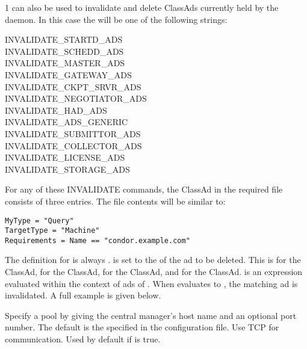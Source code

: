 \begin{ManPage}{\label{man-condor-advertise}}{1}
 can also be used to invalidate and delete
ClassAds currently held by the  daemon.  In this case
the  will be one of the following strings:
\begin{description}
\item[INVALIDATE\_STARTD\_ADS]
\item[INVALIDATE\_SCHEDD\_ADS]
\item[INVALIDATE\_MASTER\_ADS]
\item[INVALIDATE\_GATEWAY\_ADS]
\item[INVALIDATE\_CKPT\_SRVR\_ADS]
\item[INVALIDATE\_NEGOTIATOR\_ADS]
\item[INVALIDATE\_HAD\_ADS]
\item[INVALIDATE\_ADS\_GENERIC]
\item[INVALIDATE\_SUBMITTOR\_ADS]
\item[INVALIDATE\_COLLECTOR\_ADS]
\item[INVALIDATE\_LICENSE\_ADS]
\item[INVALIDATE\_STORAGE\_ADS]
\end{description}

For any of these INVALIDATE commands, the ClassAd in the required file
consists of three entries.
The file contents will be similar to:
\begin{verbatim}
MyType = "Query"
TargetType = "Machine"
Requirements = Name == "condor.example.com"
\end{verbatim}
The definition for  is always .
 is set to the  of the ad to be deleted.
This  is
 for the  ClassAd,
 for the  ClassAd,
 for the  ClassAd, and
 for the  ClassAd.
 is an expression evaluated within the context
of ads of .
When  evaluates to ,
the matching ad is invalidated.  
A full example is given below.


\begin{Options}
    \ToolArgsBaseDesc
            {Specify a pool by
            giving the central manager's host name and an optional port
	    number.  The default is the
	     specified in the configuration file.}
            {Use TCP for communication. Used by default if
	     is true.}
\end{Options}


\end{ManPage}
